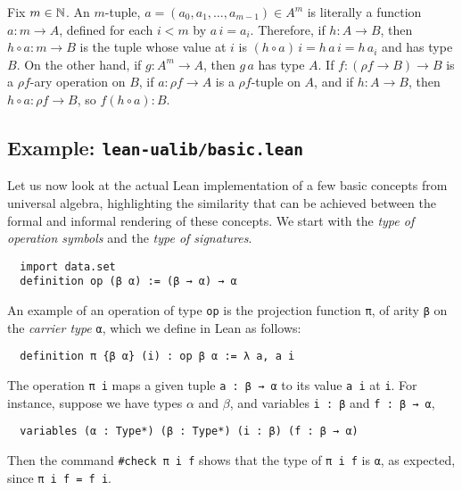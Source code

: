 \documentclass[12pt]{amsart}  %
\begin{document}
Fix $m\in \mathbb{N}$. An $m$-tuple, $a = (a_0, a_1, \dots, a_{m-1}) \in A^m$ is 
literally a function $a \colon m \to A$, defined for each $i < m$ by $a\, i = a_i$.
Therefore, if $h \colon A \to B$, then $h\circ a \colon m \to B$ is the tuple 
whose value at $i$ is $(h\circ a)\, i = h \, a\, i = h\, a_i$ and has type $B$. 
On the other hand, if $g \colon A^m \to A$, then $g \, a$ has type $A$.
If $f \colon (\rho f \to B) \to B$ is a $\rho f$-ary operation on $B$,  
if $a \colon \rho f \to A$ is a $\rho f$-tuple on $A$, and if 
$h \colon A \to B$, then $h \circ a \colon \rho f \to B$, so 
$f (h \circ a) \colon B$.




\subsection{Example: \lstinline{lean-ualib/basic.lean}}
Let us now look at the actual Lean implementation of a few basic concepts from
universal algebra, highlighting the similarity that can be achieved between the formal and 
informal rendering of these concepts.
We start with the \emph{type of operation symbols} and the \emph{type of signatures}.
\begin{lstlisting}
  import data.set
  definition op (β α) := (β → α) → α
\end{lstlisting}  
An example of an operation of type \lstinline{op} is the projection function \lstinline{π},
of arity \lstinline{β} on the \emph{carrier type} \lstinline{α}, which we define in Lean as follows:
\begin{lstlisting}
  definition π {β α} (i) : op β α := λ a, a i
\end{lstlisting}
The operation \lstinline{π i} maps a given tuple \lstinline{a : β → α} to its value \lstinline{a i} at  \lstinline{i}. For instance, suppose we have types $\alpha$ and $\beta$, and 
variables \lstinline{i : β} and \lstinline{f : β → α},
\begin{lstlisting}
  variables (α : Type*) (β : Type*) (i : β) (f : β → α) 
\end{lstlisting}
Then the command \lstinline{#check π i f} shows that the type of \lstinline{π i f} is \lstinline{α}, as expected, since \lstinline{π i f = f i}.
\end{document}
